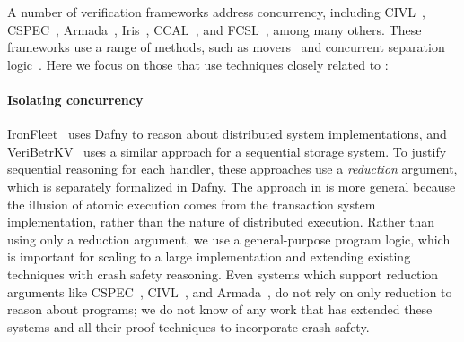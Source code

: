 A number of verification frameworks address concurrency, including
CIVL~\cite{hawblitzel:civl}, CSPEC~\cite{chajed:cspec},
Armada~\cite{lorch:armada}, Iris~\cite{jung:iris-jfp}, CCAL~\cite{gu:certikos-ccal},
and FCSL~\cite{sergey:fcsl}, among many others. These frameworks use a range of
methods, such as movers~\cite{lipton:movers} and concurrent separation
logic~\cite{brookes:csl}. Here we focus on those that use techniques closely related to \sys:




\paragraph{Isolating concurrency}
IronFleet~\cite{hawblitzel:ironfleet} uses Dafny to reason about distributed
system implementations, and VeriBetrKV~\cite{hance:veribetrkv} uses a similar
approach for a sequential storage system. To justify sequential reasoning for
each handler, these approaches use a \emph{reduction} argument, which is
separately formalized in Dafny. The approach in \sys is more general because the
illusion of atomic execution comes from the transaction system implementation,
rather than the nature of distributed execution. Rather than using only a
reduction argument, we use a general-purpose program logic, which is important
for scaling to a large implementation and extending existing techniques with
crash safety reasoning. Even systems which support reduction arguments like
CSPEC~\cite{chajed:cspec}, CIVL~\cite{hawblitzel:civl}, and
Armada~\cite{lorch:armada}, do not rely on only reduction to reason about
programs; we do not know of any work that has extended these systems and all
their proof techniques to incorporate crash safety.

